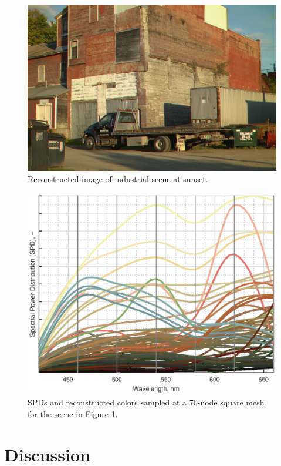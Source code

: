 \documentclass[twocolumn,10pt]{asme2ej}
\begin{document}
\begin{figure}[H]
\begin{centering}
  \includegraphics[height=0.55\linewidth]{truck.jpg}
  \caption{Reconstructed image of industrial scene at sunset.}
  \label{truck_mesh}
  \end{centering}
\end{figure}

\begin{figure}[H]
\begin{centering}
  \includegraphics[height=0.6\linewidth]{truck_SPDs.eps}
  \caption{SPDs and reconstructed colors sampled at a 70-node square mesh for the scene in Figure \ref{truck_mesh}.}
  \label{path_SPDs}
  \end{centering}
\end{figure}


\clearpage
\twocolumn

\section{Discussion}
\end{document}
